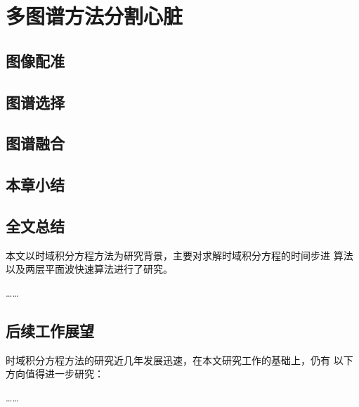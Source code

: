 
\chapter{多图谱方法分割心脏}

\section{图像配准}

\section{图谱选择}

\section{图谱融合}

\section{本章小结}




\section{全文总结}
本文以时域积分方程方法为研究背景，主要对求解时域积分方程的时间步进
算法以及两层平面波快速算法进行了研究。

……
\section{后续工作展望}
时域积分方程方法的研究近几年发展迅速，在本文研究工作的基础上，仍有
以下方向值得进一步研究：

……
